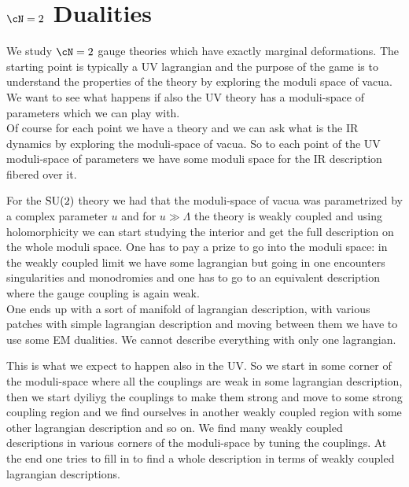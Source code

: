 \chapter{\texorpdfstring{$\cN=2$ Dualities}{Gaiotto theories}}
We study $\cN=2$ gauge theories which have exactly marginal deformations. The starting point is typically a UV lagrangian and the purpose of the game is to understand the properties of the theory by exploring the moduli space of vacua. We want to see what happens if also the UV theory has a moduli-space of parameters which we can play with.\\
Of course for each point we have a theory and we can ask what is the IR dynamics by exploring the moduli-space of vacua. So to each point of the UV moduli-space of parameters we have some moduli space for the IR description fibered over it.

For the $\mathrm{SU}(2)$ theory we had that the moduli-space of vacua was parametrized by a complex parameter $u$ and for $u\gg\Lambda$ the theory is weakly coupled and using holomorphicity we can start studying the interior and get the full description on the whole moduli space. One has to pay a prize to go into the moduli space: in the weakly coupled limit we have some lagrangian but going in one encounters singularities and monodromies and one has to go to an equivalent description where the gauge coupling is again weak.\\
One ends up with a sort of manifold of lagrangian description, with various patches with simple lagrangian description and moving between them we have to use some EM dualities. We cannot describe everything with only one lagrangian.

This is what we expect to happen also in the UV. So we start in some corner of the moduli-space where all the couplings are weak in some lagrangian description, then we start dyiliyg the couplings to make them strong and move to some strong coupling region and we find ourselves in another weakly coupled region with some other lagrangian description and so on. We find many weakly coupled descriptions in various corners of the moduli-space by tuning the couplings. At the end one tries to fill in to find a whole description in terms of weakly coupled lagrangian descriptions.

